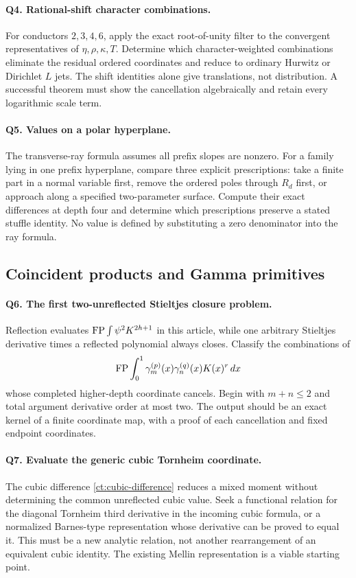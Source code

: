 \paragraph{Q4. Rational-shift character combinations.}
For conductors $2,3,4,6$, apply the exact root-of-unity filter to the
convergent representatives of $\eta,\rho,\kappa,T$. Determine which
character-weighted combinations eliminate the residual ordered
coordinates and reduce to ordinary Hurwitz or Dirichlet $L$ jets.
The shift identities alone give translations, not distribution.
A successful theorem must show the cancellation algebraically and
retain every logarithmic scale term.

\paragraph{Q5. Values on a polar hyperplane.}
The transverse-ray formula assumes all prefix slopes are nonzero.
For a family lying in one prefix hyperplane, compare three explicit
prescriptions: take a finite part in a normal variable first, remove
the ordered poles through $R_d$ first, or approach along a specified
two-parameter surface. Compute their exact differences at depth four
and determine which prescriptions preserve a stated stuffle identity.
No value is defined by substituting a zero denominator into the ray
formula.

\subsection{Coincident products and Gamma primitives}

\paragraph{Q6. The first two-unreflected Stieltjes closure problem.}
Reflection evaluates $\operatorname{FP}\int\psi^2K^{2h+1}$ in this article, while
one arbitrary Stieltjes derivative times a reflected polynomial always
closes. Classify the combinations of
\[
 \operatorname{FP}\int_0^1\gamma_m^{(p)}(x)\gamma_n^{(q)}(x)K(x)^r\,dx
\]
whose completed higher-depth coordinate cancels. Begin with
$m+n\le2$ and total argument derivative order at most two. The output
should be an exact kernel of a finite coordinate map, with a proof of
each cancellation and fixed endpoint coordinates.

\paragraph{Q7. Evaluate the generic cubic Tornheim coordinate.}
The cubic difference \eqref{ct:cubic-difference} reduces a mixed
moment without determining the common unreflected cubic value. Seek a
functional relation for the diagonal Tornheim third derivative in the
incoming cubic formula, or a normalized Barnes-type representation
whose derivative can be proved to equal it. This must be a new analytic
relation, not another rearrangement of an equivalent cubic identity.
The existing Mellin representation is a viable starting point.


